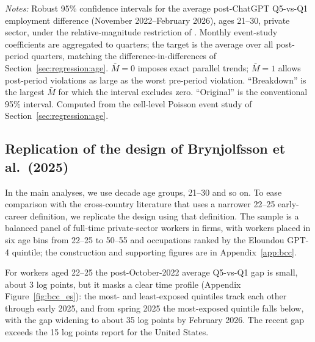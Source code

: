 \documentclass[12pt]{article}
\begin{document}
\begin{table}[tp]
  \centering
  \caption{HonestDiD sensitivity of the Q5-vs-Q1 employment effect to violations of parallel trends, ages 21--30, private sector.}
  \label{tab:honest_did}
  
  \begin{minipage}{\textwidth}\footnotesize\textit{Notes:} Robust 95\% confidence intervals for the average post-ChatGPT Q5-vs-Q1 employment difference (November 2022--February 2026), ages 21--30, private sector, under the relative-magnitude restriction of \citet{rambachan2023}. Monthly event-study coefficients are aggregated to quarters; the target is the average over all post-period quarters, matching the difference-in-differences of Section~\ref{sec:regression:age}. $\bar{M}=0$ imposes exact parallel trends; $\bar{M}=1$ allows post-period violations as large as the worst pre-period violation. ``Breakdown'' is the largest $\bar{M}$ for which the interval excludes zero. ``Original'' is the conventional 95\% interval. Computed from the cell-level Poisson event study of Section~\ref{sec:regression:age}.\end{minipage}
\end{table}



\subsection{Replication of the design of Brynjolfsson et al.\ (2025)}\label{sec:regression:bcc}

In the main analyses, we use decade age groups, 21--30 and so on. To ease comparison with the cross-country literature that uses a narrower 22--25 early-career definition, we replicate the \citet{brynjolfsson2025} design using that definition. The sample is a balanced panel of full-time private-sector workers in firms, with workers placed in six age bins from 22--25 to 50--55 and occupations ranked by the Eloundou GPT-4 quintile; the construction and supporting figures are in Appendix~\ref{app:bcc}.

For workers aged 22--25 the post-October-2022 average Q5-vs-Q1 gap is small, about 3 log points, but it masks a clear time profile (Appendix Figure~\ref{fig:bcc_es}): the most- and least-exposed quintiles track each other through early 2025, and from spring 2025 the most-exposed quintile falls below, with the gap widening to about 35 log points by February 2026. The recent gap exceeds the 15 log points \citet{brynjolfsson2025} report for the United States.
\end{document}
